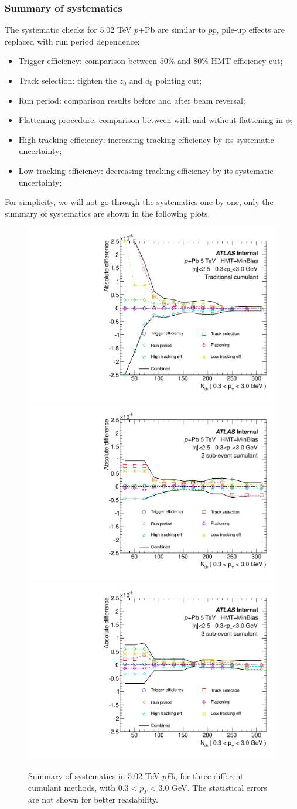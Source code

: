 \subsubsection{Summary of systematics}
The systematic checks for 5.02 TeV $p$+Pb are similar to $pp$, pile-up effects are replaced with run period dependence:
\begin{itemize}
\item Trigger efficiency: comparison between $50\%$ and $80\%$ HMT efficiency cut;
\item Track selection: tighten the $z_{0}$ and $d_{0}$ pointing cut;
\item Run period: comparison results before and after beam reversal;
\item Flattening procedure: comparison between with and without flattening in $\phi$;
\item High tracking efficiency: increasing tracking efficiency by its systematic uncertainty;
\item Low tracking efficiency: decreasing tracking efficiency by its systematic uncertainty;
\end{itemize}
For simplicity, we will not go through the systematics one by one, only the summary of systematics are shown in the following plots. 

\begin{figure}[H]
\centering
\includegraphics[width=0.3\linewidth]{figs/sec_sys/pPb5/sys_pPb5_NNNN_Har0_Pt0_Cls0.pdf}
\includegraphics[width=0.3\linewidth]{figs/sec_sys/pPb5/sys_pPb5_ABAB_Har0_Pt0_Cls0.pdf}
\includegraphics[width=0.3\linewidth]{figs/sec_sys/pPb5/sys_pPb5_ABAC_Har0_Pt0_Cls0.pdf}
\caption{Summary of systematics in 5.02 TeV $pPb$, for three different cumulant methods, with $0.3<p_{T}<3.0$ GeV. The statistical errors are not shown for better readability.}
\label{fig:sys_pPb5_sum_pt0}
\end{figure}

